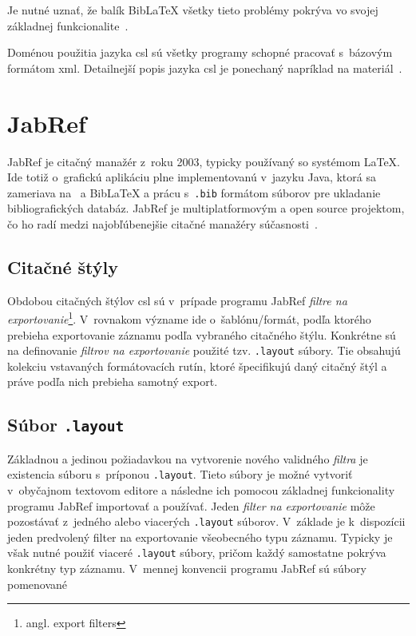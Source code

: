 \documentclass[
  color,
  table,
  nolof,
  oneside,
]{fithesis3}
\begin{document}
Je nutné uznať, že balík BibLaTeX všetky tieto problémy pokrýva vo svojej základnej funkcionalite~\cite{biblatex:manual2016}.

Doménou použitia jazyka \gls{csl} sú všetky programy schopné pracovať s~bázovým formátom \gls{xml}. Detailnejší popis jazyka \gls{csl} je ponechaný napríklad na materiál~\cite{Ansorge2013}.

\section{JabRef}

JabRef je citačný manažér z~roku 2003, typicky používaný so systémom \LaTeX. Ide totiž o~grafickú aplikáciu plne implementovanú v~jazyku Java, ktorá sa zameriava na \BibTeX\ a BibLaTeX a prácu s~\texttt{.bib} formátom súborov pre ukladanie bibliografických databáz. JabRef je multiplatformovým a open source projektom, čo ho radí medzi najobľúbenejšie citačné manažéry súčasnosti~\cite{AlternativeToJabRef}.

\subsection{Citačné štýly}

Obdobou citačných štýlov \gls{csl} sú v~prípade programu JabRef \textit{filtre na exportovanie}\footnote{angl. export filters}. V~rovnakom význame ide o~šablónu/formát, podľa ktorého prebieha exportovanie záznamu podľa vybraného citačného štýlu. Konkrétne sú na definovanie \textit{filtrov na exportovanie} použité tzv. \texttt{.layout} súbory. Tie obsahujú kolekciu vstavaných formátovacích rutín, ktoré špecifikujú daný citačný štýl a práve podľa nich prebieha samotný export.

\subsection{Súbor \texttt{.layout}}

Základnou a jedinou požiadavkou na vytvorenie nového validného \textit{filtra} je existencia súboru s~príponou \texttt{.layout}. Tieto súbory je možné vytvoriť v~obyčajnom textovom editore a následne ich pomocou základnej funkcionality programu JabRef importovať a používať. Jeden \textit{filter na exportovanie} môže pozostávať z~jedného alebo viacerých \texttt{.layout} súborov. V~základe je k~dispozícii jeden predvolený filter na exportovanie všeobecného typu záznamu. Typicky je však nutné použiť viaceré \texttt{.layout} súbory, pričom každý samostatne pokrýva konkrétny typ záznamu. V~mennej konvencii programu JabRef sú súbory pomenované
\end{document}
